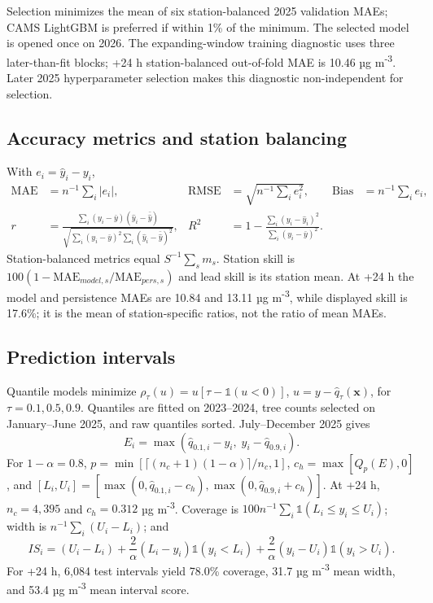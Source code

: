 \documentclass[11pt,a4paper]{article}
\begin{document}
Selection minimizes the mean of six station-balanced 2025 validation MAEs; CAMS LightGBM is preferred if within 1\% of the minimum. The selected model is opened once on 2026. The expanding-window training diagnostic uses three later-than-fit blocks; +24 h station-balanced out-of-fold MAE is 10.46 µg m\textsuperscript{-3}. Later 2025 hyperparameter selection makes this diagnostic non-independent for selection.

\subsection{Accuracy metrics and station balancing}
With $e_i=\hat y_i-y_i$,
\begin{align}
\mathrm{MAE}&=n^{-1}\sum_i|e_i|,& \mathrm{RMSE}&=\sqrt{n^{-1}\sum_i e_i^2},& \mathrm{Bias}&=n^{-1}\sum_i e_i,\\
r&=\frac{\sum_i(y_i-\bar y)(\hat y_i-\bar{\hat y})}{\sqrt{\sum_i(y_i-\bar y)^2\sum_i(\hat y_i-\bar{\hat y})^2}},&
R^2&=1-\frac{\sum_i(y_i-\hat y_i)^2}{\sum_i(y_i-\bar y)^2}.
\end{align}
Station-balanced metrics equal $S^{-1}\sum_sm_s$. Station skill is $100(1-\mathrm{MAE}_{model,s}/\mathrm{MAE}_{pers,s})$ and lead skill is its station mean. At +24 h the model and persistence MAEs are 10.84 and 13.11 µg m\textsuperscript{-3}, while displayed skill is 17.6\%; it is the mean of station-specific ratios, not the ratio of mean MAEs.

\subsection{Prediction intervals}
Quantile models minimize $\rho_\tau(u)=u[\tau-\mathbb 1(u<0)]$, $u=y-\hat q_\tau(\mathbf x)$, for $\tau=0.1,0.5,0.9$. Quantiles are fitted on 2023--2024, tree counts selected on January--June 2025, and raw quantiles sorted. July--December 2025 gives
\begin{equation} E_i=\max(\hat q_{0.1,i}-y_i,\;y_i-\hat q_{0.9,i}). \end{equation}
For $1-\alpha=0.8$, $p=\min[\lceil(n_c+1)(1-\alpha)\rceil/n_c,1]$, $c_h=\max[Q_p(E),0]$, and $[L_i,U_i]=[\max(0,\hat q_{0.1,i}-c_h),\max(0,\hat q_{0.9,i}+c_h)]$. At +24 h, $n_c=4,395$ and $c_h=0.312$ µg m\textsuperscript{-3}. Coverage is $100n^{-1}\sum_i\mathbb 1(L_i\le y_i\le U_i)$; width is $n^{-1}\sum_i(U_i-L_i)$; and
\begin{equation} IS_i=(U_i-L_i)+\frac2\alpha(L_i-y_i)\mathbb 1(y_i<L_i)+\frac2\alpha(y_i-U_i)\mathbb 1(y_i>U_i). \end{equation}
For +24 h, 6,084 test intervals yield 78.0\% coverage, 31.7 µg m\textsuperscript{-3} mean width, and 53.4 µg m\textsuperscript{-3} mean interval score.
\end{document}
